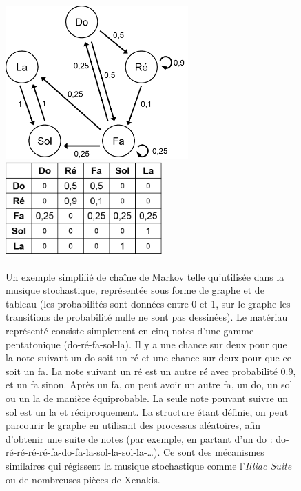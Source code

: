 \documentclass[a4paper,12pt]{article}
\begin{document}
\begin{figure}[!h]
\begin{center}
\includegraphics[width=7cm]{images/markov.png}~~~~~~~~~
\includegraphics[width=6cm]{images/markov2.png}
\caption{\footnotesize Un exemple simplifié de chaîne de Markov telle qu'utilisée dans la musique stochastique, représentée sous forme de graphe et de tableau (les probabilités sont données entre 0 et 1, sur le graphe les transitions de probabilité nulle ne sont pas dessinées). Le matériau représenté consiste simplement en cinq notes d'une gamme pentatonique (do-ré-fa-sol-la). Il y a une chance sur deux pour que la note suivant un do soit un ré et une chance sur deux pour que ce soit un fa. La note suivant un ré est un autre ré avec probabilité 0.9, et un fa sinon. Après un fa, on peut avoir un autre fa, un do, un sol ou un la de manière équiprobable. La seule note pouvant suivre un sol est un la et réciproquement. La structure étant définie, on peut parcourir le graphe en utilisant des processus aléatoires, afin d'obtenir une suite de notes (par exemple, en partant d'un do : do-ré-ré-ré-ré-fa-do-fa-la-sol-la-sol-la-\dots). Ce sont des mécanismes similaires qui régissent la musique stochastique comme l'\emph{Illiac Suite} ou de nombreuses pièces de Xenakis.}
\label{markovexemple}
\end{center}
\end{figure}
\end{document}
